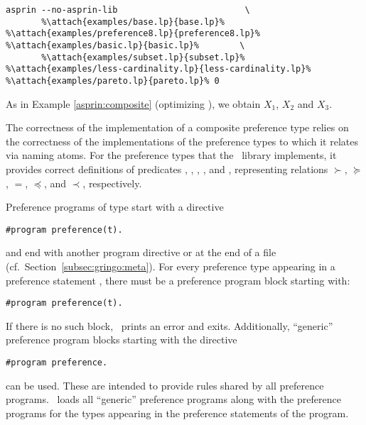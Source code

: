 \begin{example}
{  }
\begin{lstlisting}[numbers=none,escapechar=\%]
asprin --no-asprin-lib                         \
       %\attach{examples/base.lp}{base.lp}% %\attach{examples/preference8.lp}{preference8.lp}%  %\attach{examples/basic.lp}{basic.lp}%        \
       %\attach{examples/subset.lp}{subset.lp}% %\attach{examples/less-cardinality.lp}{less-cardinality.lp}% %\attach{examples/pareto.lp}{pareto.lp}% 0
\end{lstlisting}
As in Example \ref{asprin:composite} (optimizing ), we obtain $X_1$, $X_2$ and $X_3$.
\end{example}

\begin{note}
The correctness of the implementation of a composite preference type relies on the 
correctness of the implementations of the preference types to which it relates via naming atoms.
For the preference types that the \asprin\ library implements,
it provides correct definitions of predicates 
\code{better/1}, \code{bettereq/1}, \code{eq/1}, \code{worseeq/1}, and , 
representing relations $\succ$, $\succeq$, $=$, $\preceq$, and $\prec$, respectively. 
\end{note}


\begin{note}
Preference programs of type  start with a directive
\begin{lstlisting}[numbers=none]
#program preference(t).
\end{lstlisting}
and end with another program directive or at the end of a file
(cf.~Section~\ref{subsec:gringo:meta}).
For every preference type  appearing in a preference statement , 
there must be a preference program block starting with:
\begin{lstlisting}[numbers=none]
#program preference(t).
\end{lstlisting}
If there is no such block, \asprin\ prints an error and exits.
Additionally, ``generic'' preference program blocks starting with the directive
\begin{lstlisting}[numbers=none]
#program preference.
\end{lstlisting}
can be used. 
These are intended to provide rules shared by all preference programs.
\asprin\ loads all ``generic'' preference programs along with 
the preference programs for the types appearing in the preference statements of the program.
\end{note}

